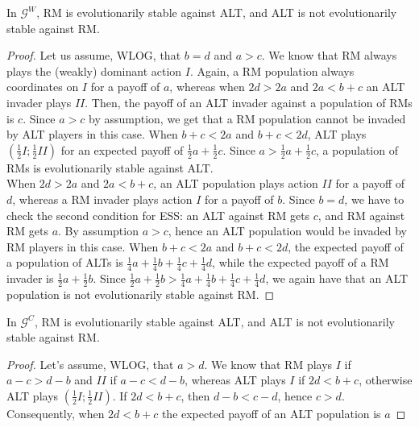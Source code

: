\documentclass[fleqn,reqno,11pt]{article}
\begin{document}
\begin{lemma}
In $\mathcal{G}^W$, RM is evolutionarily stable against ALT, and ALT is not evolutionarily stable against RM. 
\end{lemma}

\begin{proof}
Let us assume, WLOG, that $b=d$ and $a>c$. We know that RM always plays the (weakly) dominant action $I$. Again, a RM population always coordinates on $I$ for a payoff of $a$, whereas when $2d > 2a$ and $2a < b+c$ an ALT invader plays $II$. Then, the payoff of an ALT invader against a population of RMs is $c$. Since $a>c$ by assumption, we get that a RM population cannot be invaded by ALT players in this case. When $b+c < 2a$ and $b+c < 2d$, ALT plays $(\frac{1}{2}I;\frac{1}{2}II)$ for an expected payoff of $\frac{1}{2} a + \frac{1}{2} c$. Since $a > \frac{1}{2} a + \frac{1}{2} c$, a population of RMs is evolutionarily stable against ALT. \\
When $2d > 2a$ and $2a < b+c$, an ALT population plays action $II$ for a payoff of $d$, whereas a RM invader plays action $I$ for a payoff of $b$. Since $b=d$, we have to check the second condition for ESS: an ALT against RM gets $c$, and RM against RM gets $a$. By assumption $a>c$, hence an ALT population would be invaded by RM players in this case. 
When $b+c < 2a$ and $b+c < 2d$, the expected payoff of a population of ALTs is $\frac{1}{4}a+\frac{1}{4}b+\frac{1}{4}c+\frac{1}{4}d$, while the expected payoff of a RM invader is $\frac{1}{2}a+\frac{1}{2}b$. Since $\frac{1}{2}a+\frac{1}{2}b > \frac{1}{4}a+\frac{1}{4}b+\frac{1}{4}c+\frac{1}{4}d$, we again have that an ALT population is not evolutionarily stable against RM.
\end{proof}

\begin{lemma}
In $\mathcal{G}^C$, RM is evolutionarily stable against ALT, and ALT is not evolutionarily stable against RM. 
\end{lemma}

\begin{proof}
Let's assume, WLOG, that $a>d$. We know that RM plays $I$ if $ a-c > d-b $ and $II$ if $ a-c < d-b $, whereas  ALT plays $I$ if $2d<b+c$, otherwise ALT plays $(\frac{1}{2}I;\frac{1}{2}II)$. If $2d<b+c$, then $d-b<c-d$, hence $c>d$. Consequently, when $2d<b+c$ the expected payoff of an ALT population is $a$
\end{proof}
\end{document}
